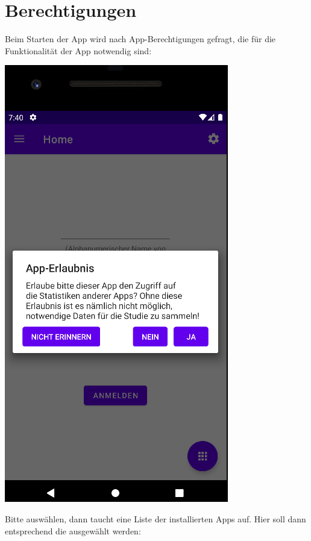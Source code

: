 \documentclass[ngerman]{tutorial}
\begin{document}
\section{Berechtigungen}
Beim Starten der App wird nach App-Berechtigungen gefragt, die für die Funktionalität der App notwendig sind:
\begin{center}
    \includegraphics[scale=0.4]{start_per.png}
\end{center}
Bitte  auswählen, dann taucht eine Liste der installierten Apps auf. Hier soll dann entsprechend die  ausgewählt werden:
\end{document}
